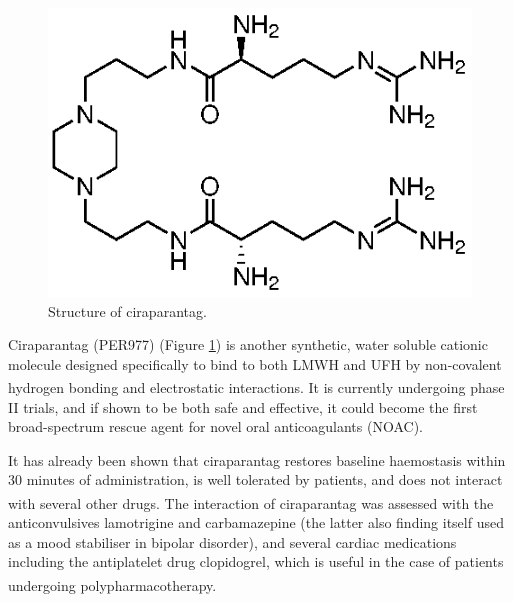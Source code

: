 \begin{figure} [h!]
\centering
\includegraphics[scale=0.85]{Figures/ciraparantag_structure.eps}
\caption{Structure of ciraparantag.}
\label{ciraparantag_structure}
\end{figure}

Ciraparantag (PER977) (Figure \ref{ciraparantag_structure}) is another synthetic, water soluble cationic molecule designed specifically to bind to both LMWH and UFH by non-covalent hydrogen bonding and electrostatic interactions.\textsuperscript{\cite{Ansell2014UseEdoxaban}} It is currently undergoing phase II trials, and if shown to be both safe and effective, it could become the first broad-spectrum rescue agent for novel oral anticoagulants (NOAC). 

It has already been shown that ciraparantag restores baseline haemostasis within 30 minutes of administration, is well tolerated by patients, and does not interact with several other drugs.\textsuperscript{\cite{Ansell2014UseEdoxaban,Ansell2016CiraparantagHeparin}} The interaction of ciraparantag was assessed with the anticonvulsives lamotrigine and carbamazepine (the latter also finding itself used as a mood stabiliser in bipolar disorder), and several cardiac medications including the antiplatelet drug clopidogrel, which is useful in the case of patients undergoing polypharmacotherapy.\textsuperscript{\cite{BritishMedicalAssociation.2017BNF2017.,Laulicht2013AntidoteEdoxaban}}

